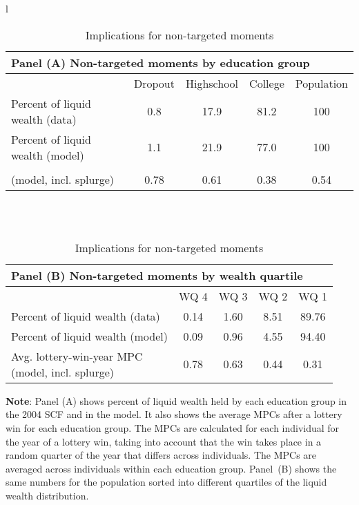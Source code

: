 \documentclass[\econtexRoot/HAFiscal]{subfiles}
\begin{document}
\begin{table}[th]
	\begin{center}
		\begin{tabular}{l}
			\begin{tabular}{lcccc}
				\multicolumn{5}{l}{Panel (A) Non-targeted moments by education group} \\ \midrule
				& Dropout & Highschool & College & Population \\ \midrule
				Percent of liquid wealth (data) & 0.8 & 17.9 & 81.2 & 100 \\
				Percent of liquid wealth (model) & 1.1 & 21.9 & 77.0 & 100 \\
				\makecell[l]{Avg. lottery-win-year MPC \\ (model, incl. splurge)} & 0.78 & 0.61 & 0.38 & 0.54
				\\ \bottomrule 
			\end{tabular} \\ \\ 
			
			\begin{tabular}{lcccc}
				\multicolumn{5}{l}{Panel (B) Non-targeted moments by wealth quartile} \\ \midrule
				 & WQ 4 & WQ 3 & WQ 2 & WQ 1 \\ \midrule
				Percent of liquid wealth (data) & 0.14 & 1.60 & 8.51 & 89.76 \\
				Percent of liquid wealth (model) & 0.09 & 0.96 & 4.55 & 94.40 \\
				\makecell[l]{Avg. lottery-win-year MPC \\ (model, incl. splurge)} & 0.78 & 0.63 & 0.44 & 0.31
				\\ \bottomrule 
			\end{tabular}
		\end{tabular}
		\caption{Implications for non-targeted moments}
		\notinsubfile{\label{tab:nonTargetedMoments}}
		\parbox{16cm}{\small \vspace{.15cm} \textbf{Note}: Panel (A) shows percent of liquid wealth held by each education group in the 2004 SCF and in the model.
It also shows the average MPCs after a lottery win for each education group.
The MPCs are calculated for each individual for the year of a lottery win, taking into account that the win takes place in a random quarter of the year that differs across individuals.
The MPCs are averaged across individuals within each education group.
Panel~(B) shows the same numbers for the population sorted into different quartiles of the liquid wealth distribution.\normalsize}
	\end{center}
\end{table}
\end{document}
